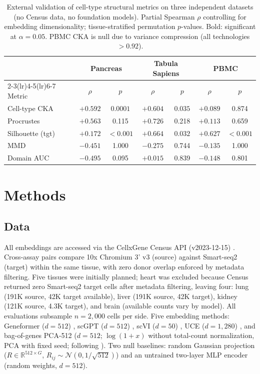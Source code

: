 \documentclass[11pt]{article}
\begin{document}
\begin{table}[t]
\centering
\caption{External validation of cell-type structural metrics on three independent datasets (no Census data, no foundation models). Partial Spearman $\rho$ controlling for embedding dimensionality; tissue-stratified permutation $p$-values. Bold: significant at $\alpha = 0.05$. PBMC CKA is null due to variance compression (all technologies $> 0.92$).}
\label{tab:external}
\small
\begin{tabular}{@{}lcccccc@{}}
\toprule
& \multicolumn{2}{c}{Pancreas} & \multicolumn{2}{c}{Tabula Sapiens} & \multicolumn{2}{c}{PBMC} \\
\cmidrule(lr){2-3}\cmidrule(lr){4-5}\cmidrule(lr){6-7}
Metric & $\rho$ & $p$ & $\rho$ & $p$ & $\rho$ & $p$ \\
\midrule
Cell-type CKA & $+0.592$ & $\mathbf{0.0001}$ & $+0.604$ & $\mathbf{0.035}$ & $+0.089$ & 0.874 \\
Procrustes & $+0.563$ & 0.115 & $+0.726$ & 0.218 & $+0.113$ & 0.659 \\
\midrule
Silhouette (tgt) & $+0.172$ & $\mathbf{<0.001}$ & $+0.664$ & $\mathbf{0.032}$ & $+0.627$ & $\mathbf{<0.001}$ \\
MMD & $-0.451$ & 1.000 & $-0.275$ & 0.744 & $-0.135$ & 1.000 \\
Domain AUC & $-0.495$ & 0.095 & $+0.015$ & 0.839 & $-0.148$ & 0.801 \\
\bottomrule
\end{tabular}
\end{table}


\section{Methods}

\subsection{Data}

All embeddings are accessed via the CellxGene Census API (v2023-12-15) \citep{abdulla2025cellxgene}. Cross-assay pairs compare 10x Chromium 3' v3 (source) against Smart-seq2 (target) within the same tissue, with zero donor overlap enforced by metadata filtering. Five tissues were initially planned; heart was excluded because Census returned zero Smart-seq2 target cells after metadata filtering, leaving four: lung (191K source, 42K target available), liver (191K source, 42K target), kidney (121K source, 4.3K target), and brain (available counts vary by model). All evaluations subsample $n = 2{,}000$ cells per side. Five embedding methods: Geneformer ($d = 512$) \citep{theodoris2023geneformer}, scGPT ($d = 512$) \citep{cui2024scgpt}, scVI ($d = 50$) \citep{lopez2018scvi}, UCE ($d = 1{,}280$) \citep{rosen2026uce}, and bag-of-genes PCA-512 ($d = 512$; $\log(1 + x)$ without total-count normalization, PCA with fixed seed; following \citealp{cole2026morpheus}). Two null baselines: random Gaussian projection ($R \in \mathbb{R}^{512 \times G}$, $R_{ij} \sim \mathcal{N}(0, 1/\sqrt{512})$) and an untrained two-layer MLP encoder (random weights, $d = 512$).
\end{document}
